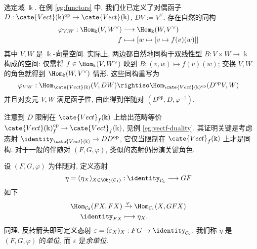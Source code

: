 \begin{example}
	选定域 $\Bbbk$. 在例 \ref{eg:functors} 中, 我们业已定义了对偶函子 $D: \cate{Vect}(\Bbbk)^\text{op} \to \cate{Vect}(\Bbbk)$, $DV := V^\vee$.  存在自然的同构
	\begin{align*}
		\varphi_{V, W}: \Hom_\Bbbk(V,  W^\vee) & \longrightarrow \Hom_\Bbbk(W, V^\vee) \\
		f & \longmapsto \left[ w \mapsto [v \mapsto f(v)(w)] \right]
	\end{align*}
	其中 $V, W$ 是 $\Bbbk$-向量空间.  实际上, 两边都自然地同构于双线性型 $B: V \times W \to \Bbbk$ 构成的空间: 仅需将 $f \in \Hom_\Bbbk(V,  W^\vee)$ 映到 $B: (v, w) \mapsto f(v)(w)$; 交换 $V, W$ 的角色就得到 $\Hom_\Bbbk(W, V^\vee)$ 情形. 这些同构重写为
	\[ \varphi_{VW} : \Hom_{\cate{Vect}(\Bbbk)}(V, DW) \rightiso \Hom_{\cate{Vect}(\Bbbk)^\text{op}}(D^\text{op}V, W) \]
	并且对变元 $V,W$ 满足函子性, 由此得到伴随对 $(D^\text{op}, D, \varphi^{-1})$.
\end{example}

注意到 $D$ 限制在 $\cate{Vect}_f(\Bbbk)$ 上给出范畴等价 $\cate{Vect}(\Bbbk)_f^\text{op} \to \cate{Vect}_f(\Bbbk)$, 见例 \ref{eg:vectf-duality}. 其证明关键是考虑态射 $\identity_{\cate{Vect}(\Bbbk)} \to DD^\text{op}$, 它仅当限制在 $\cate{Vect}_f(\Bbbk)$ 上才是同构. 对于一般的伴随对 $(F, G, \varphi)$, 类似的态射仍扮演关键角色.

\begin{definition}\label{def:adjunction-unit-counit}
	设 $(F, G, \varphi)$ 为伴随对, 定义态射
	\[ \eta = (\eta_X)_{X \in \Obj(\mathcal{C}_1)} : \identity_{\mathcal{C}_1} \longrightarrow GF \]
	如下
	\begin{align*}
		\Hom_{\mathcal{C}_2}(FX, FX) & \xrightarrow{\varphi} \Hom_{\mathcal{C}_1}(X, GFX) \\
		\identity_{FX} & \longmapsto \eta_X.
	\end{align*}
	同理, 反转箭头即可定义态射 $\varepsilon = (\varepsilon_X)_X: FG \to \identity_{\mathcal{C}_2}$. 我们称 $\eta$ 是 $(F, G, \varphi)$ 的\emph{单位}, 而 $\varepsilon$ 是\emph{余单位}.
\end{definition}

